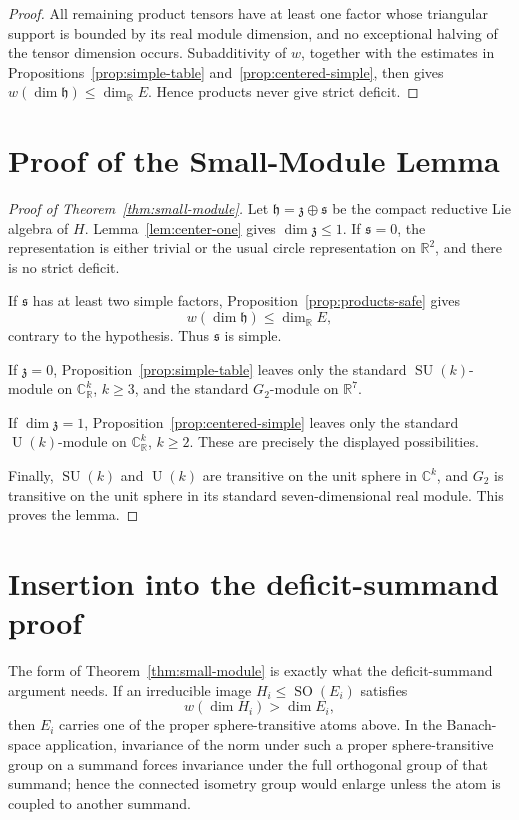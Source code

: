 \documentclass[11pt]{article}
\theoremstyle{remark}
\newcommand{\RR}{\mathbb{R}}
\newcommand{\CC}{\mathbb{C}}
\newcommand{\fh}{\mathfrak{h}}
\newcommand{\fs}{\mathfrak{s}}
\newcommand{\fz}{\mathfrak{z}}
\newcommand{\SU}{\operatorname{SU}}
\newcommand{\SO}{\operatorname{SO}}
\newcommand{\U}{\operatorname{U}}
\newcommand{\Gtwo}{G_2}
\begin{document}
\begin{proof}
All remaining product tensors have at least one factor whose triangular support is bounded by its real module dimension, and no exceptional halving of the tensor dimension occurs.  Subadditivity of \(w\), together with the estimates in Propositions~\ref{prop:simple-table} and~\ref{prop:centered-simple}, then gives \(w(\dim\fh)\leq\dim_{\RR}E\).  Hence products never give strict deficit.
\end{proof}

\section{Proof of the Small-Module Lemma}

\begin{proof}[Proof of Theorem~\ref{thm:small-module}]
Let \(\fh=\fz\oplus\fs\) be the compact reductive Lie algebra of \(H\).  Lemma~\ref{lem:center-one} gives \(\dim\fz\leq 1\).  If \(\fs=0\), the representation is either trivial or the usual circle representation on \(\RR^2\), and there is no strict deficit.

If \(\fs\) has at least two simple factors, Proposition~\ref{prop:products-safe} gives
\[
  w(\dim\fh)\leq \dim_{\RR}E,
\]
contrary to the hypothesis.  Thus \(\fs\) is simple.

If \(\fz=0\), Proposition~\ref{prop:simple-table} leaves only the standard \(\SU(k)\)-module on \(\CC^k_{\RR}\), \(k\geq 3\), and the standard \(\Gtwo\)-module on \(\RR^7\).

If \(\dim\fz=1\), Proposition~\ref{prop:centered-simple} leaves only the standard \(\U(k)\)-module on \(\CC^k_{\RR}\), \(k\geq 2\).  These are precisely the displayed possibilities.

Finally, \(\SU(k)\) and \(\U(k)\) are transitive on the unit sphere in \(\CC^k\), and \(\Gtwo\) is transitive on the unit sphere in its standard seven-dimensional real module.  This proves the lemma.
\end{proof}

\section{Insertion into the deficit-summand proof}

The form of Theorem~\ref{thm:small-module} is exactly what the deficit-summand argument needs.  If an irreducible image \(H_i\leq\SO(E_i)\) satisfies
\[
  w(\dim H_i)>\dim E_i,
\]
then \(E_i\) carries one of the proper sphere-transitive atoms above.  In the Banach-space application, invariance of the norm under such a proper sphere-transitive group on a summand forces invariance under the full orthogonal group of that summand; hence the connected isometry group would enlarge unless the atom is coupled to another summand.
\end{document}

